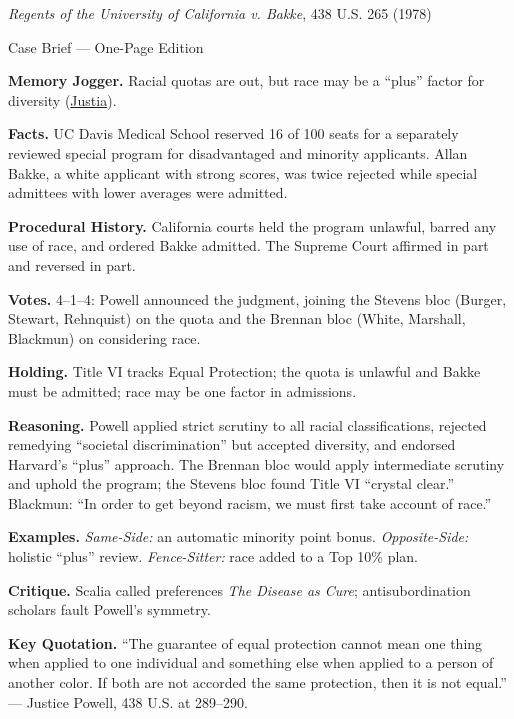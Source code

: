 \documentclass[12pt]{article}
\begin{document}
\begin{center}
{\Large \textit{Regents of the University of California v. Bakke}, 438 U.S. 265 (1978)\par}
\vspace{0.3em}
{\normalsize Case Brief --- One-Page Edition\par}
\end{center}

\textbf{Memory Jogger.} Racial quotas are out, but race may be a ``plus'' factor for diversity (\href{https://supreme.justia.com/cases/federal/us/438/265/}{Justia}).

\textbf{Facts.} UC Davis Medical School reserved 16 of 100 seats for a separately reviewed special program for disadvantaged and minority applicants. Allan Bakke, a white applicant with strong scores, was twice rejected while special admittees with lower averages were admitted.

\textbf{Procedural History.} California courts held the program unlawful, barred any use of race, and ordered Bakke admitted. The Supreme Court affirmed in part and reversed in part.

\textbf{Votes.} 4--1--4: Powell announced the judgment, joining the Stevens bloc (Burger, Stewart, Rehnquist) on the quota and the Brennan bloc (White, Marshall, Blackmun) on considering race.

\textbf{Holding.} Title VI tracks Equal Protection; the quota is unlawful and Bakke must be admitted; race may be one factor in admissions.

\textbf{Reasoning.} Powell applied strict scrutiny to all racial classifications, rejected remedying ``societal discrimination'' but accepted diversity, and endorsed Harvard's ``plus'' approach. The Brennan bloc would apply intermediate scrutiny and uphold the program; the Stevens bloc found Title VI ``crystal clear.'' Blackmun: ``In order to get beyond racism, we must first take account of race.''

\textbf{Examples.} \emph{Same-Side:} an automatic minority point bonus. \emph{Opposite-Side:} holistic ``plus'' review. \emph{Fence-Sitter:} race added to a Top 10\% plan.

\textbf{Critique.} Scalia called preferences \textit{The Disease as Cure}; antisubordination scholars fault Powell's symmetry.

\textbf{Key Quotation.} ``The guarantee of equal protection cannot mean one thing when applied to one individual and something else when applied to a person of another color. If both are not accorded the same protection, then it is not equal.'' --- Justice Powell, 438 U.S. at 289--290.
\end{document}

